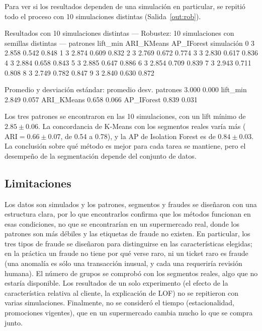 \documentclass[11pt,letterpaper]{article}
\begin{document}
Para ver si los resultados dependen de una simulación en particular, se repitió todo el proceso con 10 simulaciones distintas (Salida~\ref{out:rob}).

\begin{consola}[label=out:rob]{Resultados con 10 simulaciones distintas}
--- Robustez: 10 simulaciones con semillas distintas ---
            patrones  lift_min  ARI_KMeans  AP_IForest
simulación
0                  3     2.858       0.542       0.848
1                  3     2.874       0.609       0.832
2                  3     2.769       0.672       0.774
3                  3     2.830       0.617       0.836
4                  3     2.884       0.658       0.843
5                  3     2.885       0.647       0.886
6                  3     2.854       0.709       0.839
7                  3     2.943       0.711       0.808
8                  3     2.749       0.782       0.847
9                  3     2.840       0.630       0.872

Promedio y desviación estándar:
            promedio  desv.
patrones       3.000  0.000
lift_min       2.849  0.057
ARI_KMeans     0.658  0.066
AP_IForest     0.839  0.031
\end{consola}

Los tres patrones se encontraron en las 10 simulaciones, con un lift mínimo de $2.85 \pm 0.06$. La concordancia de K-Means con los segmentos reales varía más ($\text{ARI}=0.66 \pm 0.07$, de 0.54 a 0.78), y la AP de Isolation Forest es de $0.84 \pm 0.03$. La conclusión sobre qué método es mejor para cada tarea se mantiene, pero el desempeño de la segmentación depende del conjunto de datos.

\subsection{Limitaciones}

Los datos son simulados y los patrones, segmentos y fraudes se diseñaron con una estructura clara, por lo que encontrarlos confirma que los métodos funcionan en esas condiciones, no que se encontrarían en un supermercado real, donde los patrones son más débiles y las etiquetas de fraude no existen. En particular, los tres tipos de fraude se diseñaron para distinguirse en las características elegidas; en la práctica un fraude no tiene por qué verse raro, ni un ticket raro es fraude (una anomalía es sólo una transacción inusual, y cada una requeriría revisión humana). El número de grupos se comprobó con los segmentos reales, algo que no estaría disponible. Los resultados de un solo experimento (el efecto de la característica relativa al cliente, la explicación de LOF) no se repitieron con varias simulaciones. Finalmente, no se consideró el tiempo (estacionalidad, promociones vigentes), que en un supermercado cambia mucho lo que se compra junto.
\end{document}
